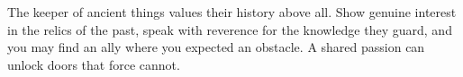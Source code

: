 \documentclass{article}
\begin{document}
\begin{infobox}
The keeper of ancient things values their history above all. Show genuine interest in the relics of the past, speak with reverence for the knowledge they guard, and you may find an ally where you expected an obstacle. A shared passion can unlock doors that force cannot.
\end{infobox}
\end{document}
